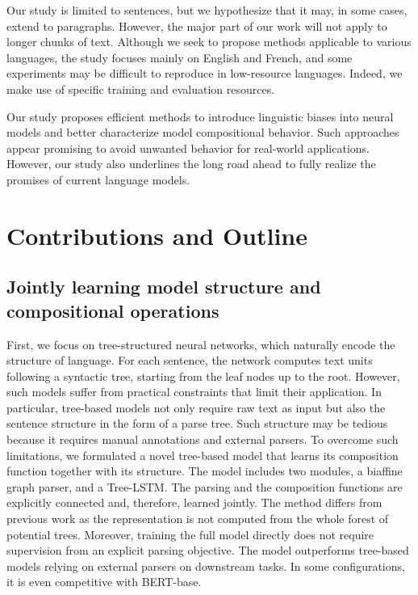 Our study is limited to sentences, but we hypothesize that it may, in some cases, extend to paragraphs. However, the major part of our work will not apply to longer chunks of text. Although we seek to propose methods applicable to various languages, the study focuses mainly on English and French, and some experiments may be difficult to reproduce in low-resource languages. Indeed, we make use of specific training and evaluation resources.

Our study proposes efficient methods to introduce linguistic biases into neural models and better characterize model compositional behavior. Such approaches appear promising to avoid unwanted behavior for real-world applications. However, our study also underlines the long road ahead to fully realize the promises of current language models.

\section{Contributions and Outline}

\subsection{Jointly learning model structure and compositional operations}

First, we focus on tree-structured neural networks, which naturally encode the structure of language. For each sentence, the network computes text units following a syntactic tree, starting from the leaf nodes up to the root. However, such models suffer from practical constraints that limit their application. In particular, tree-based models not only require raw text as input but also the sentence structure in the form of a parse tree. Such structure may be tedious because it requires manual annotations and external parsers. To overcome such limitations, we formulated a novel tree-based model that learns its composition function together with its structure. The model includes two modules, a biaffine graph parser, and a Tree-LSTM. The parsing and the composition functions are explicitly connected and, therefore, learned jointly. The method differs from previous work as the representation is not computed from the whole forest of potential trees. Moreover, training the full model directly does not require supervision from an explicit parsing objective. The model outperforms tree-based models relying on external parsers on downstream tasks. In some configurations, it is even competitive with BERT-base.


